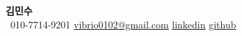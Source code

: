\begin{center}
    \textbf{\Huge \scshape 김민수} \\ \vspace{1pt}
     \ \small 010-7714-9201 \quad
    \href{mailto:vibrio0102@gmail.com}{ \underline{vibrio0102@gmail.com}} \quad
    \href{https://www.linkedin.com/in/minsoo-kim-167405131}{ \underline{linkedin}} \quad
    \href{https://github.com/msk-psp}{ \underline{github}}
\end{center}